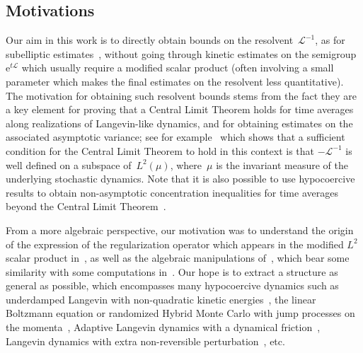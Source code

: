 \documentclass[AHL,Unicode,longabstracts,MathTools,published]{cedram}
\newcommand{\rme}{\mathrm{e}}
\newcommand{\cL}{\mathcal{L}}
\begin{document}
\subsection*{Motivations}
Our aim in this work is to directly obtain bounds on the resolvent~$\cL^{-1}$, as for subelliptic estimates~\cite{EH03,HN04,HN05}, without going through kinetic estimates on the semigroup $\rme^{t \cL}$ which usually require a modified scalar product (often involving a small parameter which makes the final estimates on the resolvent less quantitative). The motivation for obtaining such resolvent bounds stems from the fact they are a key element for proving that a Central Limit Theorem holds for time averages along realizations of Langevin-like dynamics, and for obtaining estimates on the associated asymptotic variance; see for example~\cite{Bhattacharya} which shows that a sufficient condition for the Central Limit Theorem to hold in this context is that $-\cL^{-1}$ is well defined on a subspace of~$L^2(\mu)$, where~$\mu$ is the invariant measure of the underlying stochastic dynamics. Note that it is also possible to use hypocoercive results to obtain non-asymptotic concentration inequalities for time averages beyond the Central Limit Theorem~\cite{BRB19,Mon19b}.

From a more algebraic perspective, our motivation was to understand the origin of the expression of the regularization operator which appears in the modified $L^2$ scalar product in~\cite{Herau06,DMS09,DMS15}, as well as the algebraic manipulations of~\cite{AM19,CLW19}, which bear some similarity with some computations in~\cite{Herau06,DMS09,DMS15}. Our hope is to extract a structure as general as possible, which encompasses many hypocoercive dynamics such as underdamped Langevin with non-quadratic kinetic energies~\cite{ST18}, the linear Boltzmann equation or randomized Hybrid Monte Carlo with jump processes on the momenta~\cite{BRSS17}, Adaptive Langevin dynamics with a dynamical friction~\cite{Herzog18,LSS19}, Langevin dynamics with extra non-reversible perturbation~\cite{DNS17}, etc.
\end{document}
